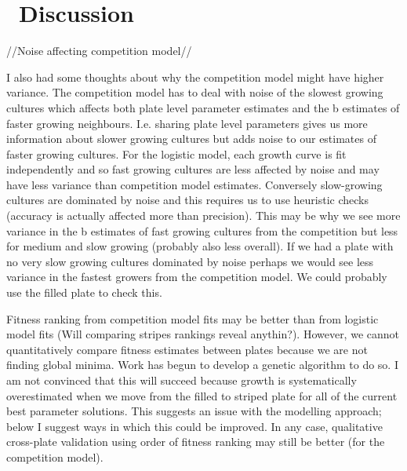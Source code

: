 \graphicspath{{images/}}

\section{\thesection~Discussion}
\label{sec:discussion}

//Noise affecting competition model//

I also had some thoughts about why the competition model might have
higher variance. The competition model has to deal with noise of the
slowest growing cultures which affects both plate level parameter
estimates and the b estimates of faster growing
neighbours. I.e. sharing plate level parameters gives us more
information about slower growing cultures but adds noise to our
estimates of faster growing cultures. For the logistic model, each
growth curve is fit independently and so fast growing cultures are
less affected by noise and may have less variance than competition
model estimates. Conversely slow-growing cultures are dominated by
noise and this requires us to use heuristic checks (accuracy is
actually affected more than precision). This may be why we see more
variance in the b estimates of fast growing cultures from the
competition but less for medium and slow growing (probably also less
overall). If we had a plate with no very slow growing cultures
dominated by noise perhaps we would see less variance in the fastest
growers from the competition model. We could probably use the filled
plate to check this.



Fitness ranking from competition model fits may be better than from
logistic model fits (Will comparing stripes rankings reveal
anythin?). However, we cannot quantitatively compare fitness estimates
between plates because we are not finding global minima. Work has
begun to develop a genetic algorithm to do so. I am not convinced that
this will succeed because growth is systematically overestimated when
we move from the filled to striped plate for all of the current best
parameter solutions. This suggests an issue with the modelling
approach; below I suggest ways in which this could be improved. In
any case, qualitative cross-plate validation using order of fitness
ranking may still be better (for the competition model).


